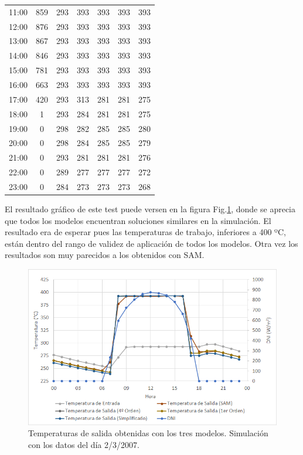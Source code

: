 \begin{table}[H]
{\begin{tabular}{ccccccc}
11:00 & 859 & 293 & 393 & 393 & 393 & 393 \\
12:00 & 876 & 293 & 393 & 393 & 393 & 393 \\
13:00 & 867 & 293 & 393 & 393 & 393 & 393 \\
14:00 & 846 & 293 & 393 & 393 & 393 & 393 \\
15:00 & 781 & 293 & 393 & 393 & 393 & 393 \\
16:00 & 663 & 293 & 393 & 393 & 393 & 393 \\
17:00 & 420 & 293 & 313 & 281 & 281 & 275 \\
18:00 & 1   & 293 & 284 & 281 & 281 & 275 \\
19:00 & 0   & 298 & 282 & 285 & 285 & 280 \\
20:00 & 0   & 298 & 284 & 285 & 285 & 279 \\
21:00 & 0   & 293 & 281 & 281 & 281 & 276 \\
22:00 & 0   & 289 & 277 & 277 & 277 & 272 \\
23:00 & 0   & 284 & 273 & 273 & 273 & 268
\end{tabular}%
}
\end{table}

El resultado gráfico de este test puede versen en la figura Fig.\ref{fig:temperaturas_modelos}, donde se aprecia que todos los modelos encuentran soluciones similares en la simulación. El resultado era de esperar pues las temperaturas de trabajo, inferiores a 400 ºC, están dentro del rango de validez de aplicación de todos los modelos. Otra vez los resultados son muy parecidos a los obtenidos con SAM.

\begin{figure}[H]
\includegraphics[width=0.9\linewidth]{images/temperaturas_modelos.png}
\caption{Temperaturas de salida obtenidas con los tres modelos. Simulación con los datos del día 2/3/2007.} 
\label{fig:temperaturas_modelos}
\end{figure}

